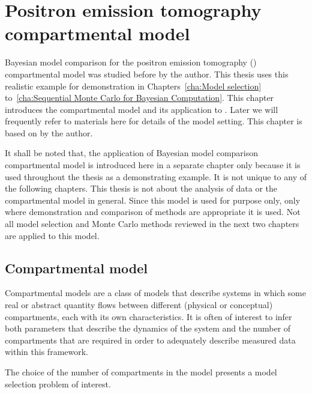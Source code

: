 \chapter{Positron emission tomography compartmental model}
\label{cha:Positron emission tomography compartmental model}

Bayesian model comparison for the positron emission tomography (\pet) compartmental model was studied before by the author. This thesis uses this realistic example for demonstration in Chapters~\ref{cha:Model selection} to~\ref{cha:Sequential Monte Carlo for Bayesian Computation}. This chapter introduces the compartmental model and its application to \pet. Later we will frequently refer to materials here for details of the model setting. This chapter is based on \cite{Zhou2013} by the author.

\begin{draftpar}
It shall be noted that, the application of Bayesian model comparison  \pet compartmental model is introduced here in a separate chapter only because it is used throughout the thesis as a demonstrating example. It is not unique to any of the following chapters. This thesis is not about the analysis of \pet data or the compartmental model in general. Since this model is used for  purpose only, only where demonstration and comparison of methods are appropriate it is used. Not all model selection and Monte Carlo methods reviewed in the next two chapters are applied to this model.
\end{draftpar}

\section{Compartmental model}
\label{sec:Compartmental model}

Compartmental models are a class of models that describe systems in which some real or abstract quantity flows between different (physical or conceptual) compartments, each with its own characteristics. It is often of interest to infer both parameters that describe the dynamics of the system and the number of compartments that are required in order to adequately describe measured data within this framework.
\begin{draftpar}
The choice of the number of compartments in the model presents a model selection problem of interest.
\end{draftpar}

